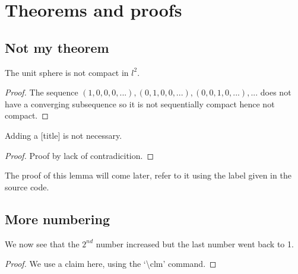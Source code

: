 \documentclass[thesis]{subfiles}
\begin{document}
\newpage %
\section{Theorems and proofs}
\label{sec:theorems} %

\subsection{Not my theorem}
\begin{theorem}[Mine] %
The unit sphere is not compact in $l^2$.
\begin{proof} 
The sequence $(1,0,0,0,...),(0,1,0,0,...),(0,0,1,0,...),...$ does not have a converging subsequence so it is not sequentially compact hence not compact.
\end{proof} 
\end{theorem}


\begin{theorem}
Adding a [title] is not necessary.
\begin{proof}
Proof by lack of contradicition.
\end{proof}
\end{theorem}


\begin{lemma}
The proof of this lemma will come later, refer to it using the label given in the source code.
\label{lm.laterproof} %
\end{lemma}


\subsection{More numbering}

\begin{lemma}
We now see that the $2^{nd}$ number increased but the last number went back to 1.
\begin{proof}
We use a claim here, using the `\textbackslash clm' command.
\end{proof}
\end{lemma}
\end{document}
